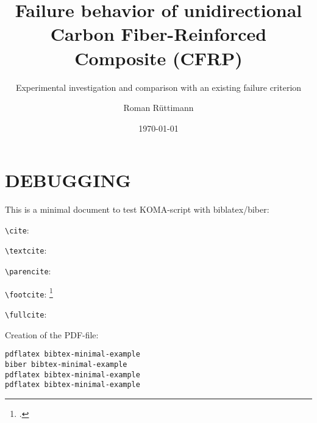 \documentclass[paper=a4, twoside=true, fontsize=11pt, ]{scrbook}
\title{Failure behavior of unidirectional Carbon Fiber-Reinforced Composite (CFRP)}
\subtitle{Experimental investigation and comparison with an existing failure criterion}
\author{Roman Rüttimann}
\date{\today}
\newcommand*{\texpath}{content}
\begin{document}
\maketitle
\cleardoublepage

\frontmatter

\cleardoublepage
%

\cleardoublepage
\tableofcontents
\cleardoublepage

\cleardoublepage

\mainmatter







\cleardoublepage
{}
\listoffigures

\cleardoublepage
{}
{}
\listoftables

\cleardoublepage
{}
\clearpage
\renewcommand*{\chapterpagestyle}{empty}
\printbibliography

\chapter{DEBUGGING}

This is a minimal document to test KOMA-script with biblatex/biber:

\verb+\cite+: \cite{daniel2007failure}

\verb+\textcite+: \textcite{daniel2018new}

\verb+\parencite+: \parencite{calsson2014experimental}

\verb+\footcite+: \footcite{D6641standard}

\verb+\fullcite+: 

Creation of the PDF-file:
\begin{verbatim}
pdflatex bibtex-minimal-example
biber bibtex-minimal-example
pdflatex bibtex-minimal-example
pdflatex bibtex-minimal-example
\end{verbatim}

\appendix\appendixtrue
\clearpage

\end{document}
